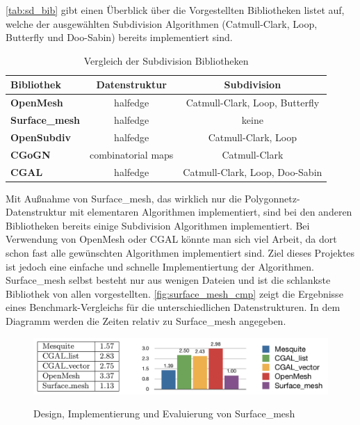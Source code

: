 \autoref{tab:sd_bib} gibt einen Überblick über die Vorgestellten Bibliotheken listet auf, welche der ausgewählten Subdivision Algorithmen
(Catmull-Clark, Loop, Butterfly und Doo-Sabin) bereits implementiert sind.

\begin{table}[h]
\caption{Vergleich der Subdivision Bibliotheken}
\center
\begin{tabular}{|l|c|c|}
\toprule
\textbf{Bibliothek} & \textbf{Datenstruktur} & \textbf{Subdivision}\\
\midrule
\textbf{OpenMesh} & halfedge & Catmull-Clark, Loop, Butterfly\\
\textbf{Surface\_mesh} & halfedge & keine\\
\textbf{OpenSubdiv} & halfedge & Catmull-Clark, Loop\\
\textbf{CGoGN} & combinatorial maps & Catmull-Clark\\
\textbf{\acs{CGAL}} & halfedge & Catmull-Clark, Loop, Doo-Sabin\\
\bottomrule
\end{tabular}
\label{tab:sd_bib}
\end{table}

Mit Außnahme von Surface\_mesh, das wirklich nur die Polygonnetz-Datenstruktur mit elementaren Algorithmen implementiert, sind bei den anderen Bibliotheken bereits
einige Subdivision Algorithmen implementiert.
Bei Verwendung von OpenMesh oder CGAL könnte man sich viel Arbeit, da dort schon fast alle gewünschten Algorithmen implementiert sind.
Ziel dieses Projektes ist jedoch eine einfache und schnelle Implementiertung der Algorithmen.
Surface\_mesh selbst besteht nur aus wenigen Dateien und ist die schlankste Bibliothek von allen vorgestellten.
\autoref{fig:surface_mesh_cmp} zeigt die Ergebnisse eines Benchmark-Vergleichs für die unterschiedlichen Datenstrukturen.
In dem Diagramm werden die Zeiten relativ zu Surface\_mesh angegeben.

\begin{figure}
  \caption{Design, Implementierung und Evaluierung von Surface\_mesh \cite{Sieger.}}
  \centering
  \includegraphics[width=1.0\textwidth]{content/media/surface_mesh_cmp}
  \label{fig:surface_mesh_cmp}
\end{figure}

